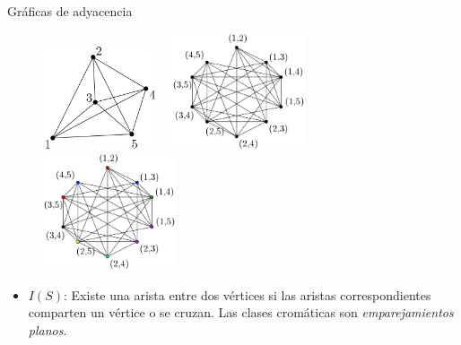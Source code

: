 \begin{frame}{Gráficas de adyacencia}
\begin{figure}
	\centering
	\includegraphics[width=0.3\textwidth]{images/K5}%
	~\vrule
	\includegraphics[width=0.35\textwidth]{images/grafica3k5}%
	~\vrule
	\includegraphics[width=0.35\textwidth]{images/grafica3k5_colored}%
\end{figure}

\begin{itemize}
\item $I(S)$: Existe una arista entre dos vértices si las aristas correspondientes comparten un vértice o se cruzan. Las clases cromáticas son \emph{emparejamientos planos}.

\end{itemize}
\end{frame}
